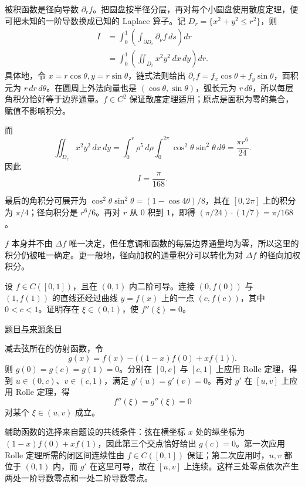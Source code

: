 \documentclass[UTF8,12pt,a4paper,fontset=fandol]{ctexart}
\begin{document}
\begin{solve}\label{ans:pre01-math:6}

被积函数是径向导数 $\partial_r f$。把圆盘按半径分层，再对每个小圆盘使用散度定理，便可把未知的一阶导数换成已知的 Laplace 算子。记 $D_r=\{x^2+y^2\le r^2\}$，则
\[
\begin{aligned}
I
&=\int_0^1\left(\int_{\partial D_r}\partial_\nu f\,ds\right)dr\\
&=\int_0^1\left(\iint_{D_r}x^2y^2\,dx\,dy\right)dr.
\end{aligned}
\]
具体地，令 $x=r\cos\theta,y=r\sin\theta$，链式法则给出 $\partial_r f=f_x\cos\theta+f_y\sin\theta$，面积元为 $r\,dr\,d\theta$。在圆周上外法向量也是 $(\cos\theta,\sin\theta)$，弧长元为 $r\,d\theta$，所以每层角积分恰好等于边界通量。$f\in C^2$ 保证散度定理适用；原点是面积为零的集合，赋值不影响积分。

而
\[
\iint_{D_r}x^2y^2\,dx\,dy
=\int_0^r\rho^5\,d\rho
\int_0^{2\pi}\cos^2\theta\sin^2\theta\,d\theta
=\frac{\pi r^6}{24}.
\]
因此
\[
\boxed{I=\frac\pi{168}.}
\]

最后的角积分可展开为 $\cos^2\theta\sin^2\theta=(1-\cos4\theta)/8$，其在 $[0,2\pi]$ 上的积分为 $\pi/4$；径向积分是 $r^6/6$。再对 $r$ 从 $0$ 积到 $1$，即得 $(\pi/24)\cdot(1/7)=\pi/168$。

\end{solve}

\begin{remark}[方法与条件]$f$ 本身并不由 $\Delta f$ 唯一决定，但任意调和函数的每层边界通量均为零，所以这里的积分仍被唯一确定。更一般地，径向加权的通量积分可以转化为对 $\Delta f$ 的径向加权积分。\end{remark}

\begin{example}[来源序号7]\label{ex:pre01-math:7}\label{pr:pre01-math:7}

设 $f\in C([0,1])$，且在 $(0,1)$ 内二阶可导。连接 $(0,f(0))$ 与 $(1,f(1))$ 的直线还经过曲线 $y=f(x)$ 上的一点 $(c,f(c))$，其中 $0<c<1$。证明存在 $\xi\in(0,1)$，使 $f''(\xi)=0$。

\par\href{https://github.com/lzxcr/cmc-mathematics/blob/64916fa1fdbc3e444a652eca204d5669058ee321/src/problems/preliminary/01/07.md}{题目与来源条目}

\end{example}

\begin{solve}\label{ans:pre01-math:7}

减去弦所在的仿射函数，令
\[
g(x)=f(x)-\bigl((1-x)f(0)+xf(1)\bigr).
\]
则 $g(0)=g(c)=g(1)=0$。分别在 $[0,c]$ 与 $[c,1]$ 上应用 Rolle 定理，得到 $u\in(0,c)$、$v\in(c,1)$，满足 $g'(u)=g'(v)=0$。再对 $g'$ 在 $[u,v]$ 上应用 Rolle 定理，得
\[
f''(\xi)=g''(\xi)=0
\]
对某个 $\xi\in(u,v)$ 成立。

辅助函数的选择来自题设的共线条件：弦在横坐标 $x$ 处的纵坐标为 $(1-x)f(0)+xf(1)$，因此第三个交点恰好给出 $g(c)=0$。第一次应用 Rolle 定理所需的闭区间连续性由 $f\in C([0,1])$ 保证；第二次应用时，$u,v$ 都位于 $(0,1)$ 内，而 $g'$ 在这里可导，故在 $[u,v]$ 上连续。这样三处零点依次产生两处一阶导数零点和一处二阶导数零点。

\end{solve}
\end{document}

